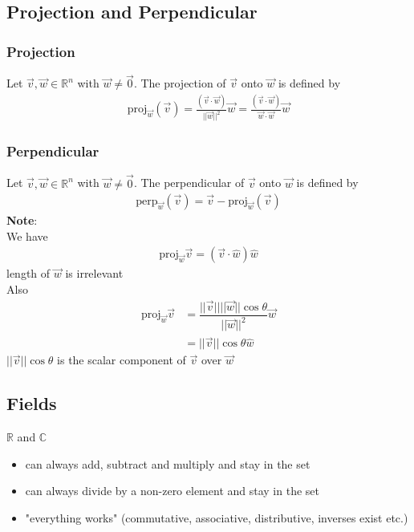 \documentclass[12pt, letterpaper]{article}
\begin{document}
\subsection{Projection and Perpendicular}
\subsubsection{Projection}
Let $\vec{v}, \vec{w}\in\mathbb{R}^n$ with $\vec{w}\neq\vec{0}$. The projection of $\vec{v}$ onto $\vec{w}$ is defined by
\begin{align*}
    \text{proj}_{\vec{w}}(\vec{v}) = \frac{(\vec{v}\cdot\vec{w})}{||\vec{w}||^2}\vec{w} = \frac{(\vec{v}\cdot\vec{w})}{\vec{w}\cdot\vec{w}}\vec{w}
\end{align*}
\subsubsection{Perpendicular}
Let $\vec{v}, \vec{w}\in\mathbb{R}^n$ with $\vec{w}\neq\vec{0}$. The perpendicular of $\vec{v}$ onto $\vec{w}$ is defined by
\begin{align*}
    \text{perp}_{\vec{w}}(\vec{v}) = \vec{v} - \text{proj}_{\vec{w}}(\vec{v})
\end{align*}
\textbf{Note}: \\
We have
\begin{align*}
    \text{proj}_{\vec{w}}\vec{v} = (\vec{v}\cdot\hat{w})\hat{w}
\end{align*}    
length of $\vec{w}$ is irrelevant \\
Also
\begin{align*}
    \text{proj}_{\vec{w}}\vec{v} &= \dfrac{||\vec{v}||||\vec{w}||\cos\theta}{||\vec{w}||^2}\vec{w} \\
                                 &= ||\vec{v}||\cos\theta\hat{w}
\end{align*}
$||\vec{v}||\cos\theta$ is the scalar component of $\vec{v}$ over $\vec{w}$
\subsection{Fields}
$\mathbb{R}$ and $\mathbb{C}$
\begin{itemize}
    \item can always add, subtract and multiply and stay in the set
    \item can always divide by a non-zero element and stay in the set
    \item "everything works" (commutative, associative, distributive, inverses exist etc.)
\end{itemize}
\end{document}
